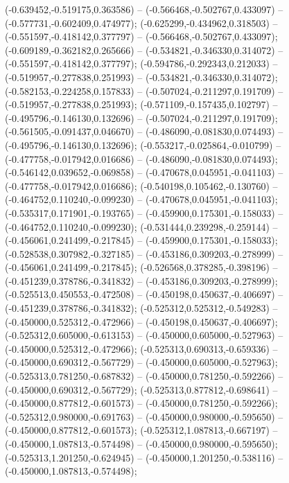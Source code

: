  (-0.639452,-0.519175,0.363586) -- (-0.566468,-0.502767,0.433097) -- (-0.577731,-0.602409,0.474977);
 (-0.625299,-0.434962,0.318503) -- (-0.551597,-0.418142,0.377797) -- (-0.566468,-0.502767,0.433097);
 (-0.609189,-0.362182,0.265666) -- (-0.534821,-0.346330,0.314072) -- (-0.551597,-0.418142,0.377797);
 (-0.594786,-0.292343,0.212033) -- (-0.519957,-0.277838,0.251993) -- (-0.534821,-0.346330,0.314072);
 (-0.582153,-0.224258,0.157833) -- (-0.507024,-0.211297,0.191709) -- (-0.519957,-0.277838,0.251993);
 (-0.571109,-0.157435,0.102797) -- (-0.495796,-0.146130,0.132696) -- (-0.507024,-0.211297,0.191709);
 (-0.561505,-0.091437,0.046670) -- (-0.486090,-0.081830,0.074493) -- (-0.495796,-0.146130,0.132696);
 (-0.553217,-0.025864,-0.010799) -- (-0.477758,-0.017942,0.016686) -- (-0.486090,-0.081830,0.074493);
 (-0.546142,0.039652,-0.069858) -- (-0.470678,0.045951,-0.041103) -- (-0.477758,-0.017942,0.016686);
 (-0.540198,0.105462,-0.130760) -- (-0.464752,0.110240,-0.099230) -- (-0.470678,0.045951,-0.041103);
 (-0.535317,0.171901,-0.193765) -- (-0.459900,0.175301,-0.158033) -- (-0.464752,0.110240,-0.099230);
 (-0.531444,0.239298,-0.259144) -- (-0.456061,0.241499,-0.217845) -- (-0.459900,0.175301,-0.158033);
 (-0.528538,0.307982,-0.327185) -- (-0.453186,0.309203,-0.278999) -- (-0.456061,0.241499,-0.217845);
 (-0.526568,0.378285,-0.398196) -- (-0.451239,0.378786,-0.341832) -- (-0.453186,0.309203,-0.278999);
 (-0.525513,0.450553,-0.472508) -- (-0.450198,0.450637,-0.406697) -- (-0.451239,0.378786,-0.341832);
 (-0.525312,0.525312,-0.549283) -- (-0.450000,0.525312,-0.472966) -- (-0.450198,0.450637,-0.406697);
 (-0.525312,0.605000,-0.613153) -- (-0.450000,0.605000,-0.527963) -- (-0.450000,0.525312,-0.472966);
 (-0.525313,0.690313,-0.659336) -- (-0.450000,0.690312,-0.567729) -- (-0.450000,0.605000,-0.527963);
 (-0.525313,0.781250,-0.687832) -- (-0.450000,0.781250,-0.592266) -- (-0.450000,0.690312,-0.567729);
 (-0.525313,0.877812,-0.698641) -- (-0.450000,0.877812,-0.601573) -- (-0.450000,0.781250,-0.592266);
 (-0.525312,0.980000,-0.691763) -- (-0.450000,0.980000,-0.595650) -- (-0.450000,0.877812,-0.601573);
 (-0.525312,1.087813,-0.667197) -- (-0.450000,1.087813,-0.574498) -- (-0.450000,0.980000,-0.595650);
 (-0.525313,1.201250,-0.624945) -- (-0.450000,1.201250,-0.538116) -- (-0.450000,1.087813,-0.574498);
